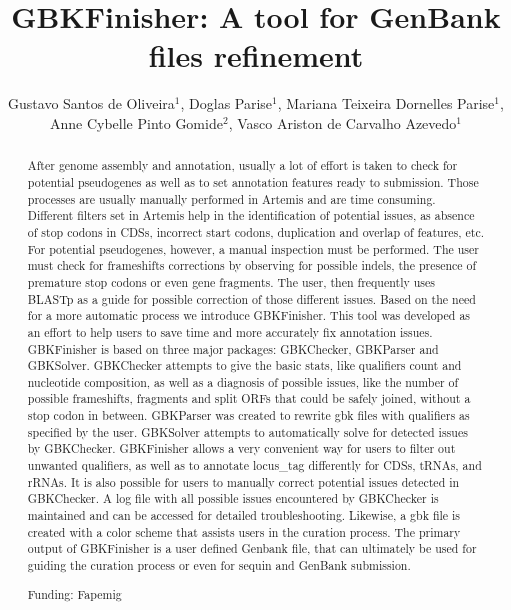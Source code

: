 \documentclass[twoside]{article}
\title{\vspace{-15mm}\fontsize{24pt}{10pt}\selectfont\textbf{GBKFinisher: A tool for GenBank files refinement}} %
\author{Gustavo Santos de Oliveira$^1$, Doglas Parise$^1$, Mariana Teixeira Dornelles Parise$^1$, Anne Cybelle Pinto Gomide$^2$, Vasco Ariston de Carvalho Azevedo$^1$}
\affil{1 UFMG\\ }
\date{}
\begin{document}
\maketitle %

\thispagestyle{fancy} %


\begin{abstract}
After genome assembly and annotation, usually a lot of effort is taken to check for potential pseudogenes as well as to set annotation features ready to submission. Those processes are usually manually performed in Artemis and are time consuming. Different filters set in Artemis help in the identification of potential issues, as absence of stop codons in CDSs, incorrect start codons, duplication and overlap of features, etc. For potential pseudogenes, however, a manual inspection must be performed. The user must check for frameshifts corrections by observing for possible indels, the presence of premature stop codons or even gene fragments. The user, then frequently uses BLASTp as a guide for possible correction of those different issues. Based on the need for a more automatic process we introduce GBKFinisher. This tool was developed as an effort to help users to save time and more accurately fix annotation issues. GBKFinisher is based on three major packages: GBKChecker, GBKParser and GBKSolver. GBKChecker attempts to give the basic stats, like qualifiers count and nucleotide composition, as well as a diagnosis of possible issues, like the number of possible frameshifts, fragments and split ORFs that could be safely joined, without a stop codon in between. GBKParser was created to rewrite gbk files with qualifiers as specified by the user. GBKSolver attempts to automatically solve for detected issues by GBKChecker.  GBKFinisher allows a very convenient way for users to filter out unwanted qualifiers, as well as to annotate locus\_tag differently for CDSs, tRNAs, and rRNAs. It is also possible for users to manually correct potential issues detected in GBKChecker. A log file with all possible issues encountered by GBKChecker is maintained and can be accessed for detailed troubleshooting. Likewise, a gbk file is created with a color scheme that assists users in the curation process. The primary output of GBKFinisher is a user defined Genbank file, that can ultimately be used for guiding the curation process or even for sequin and GenBank submission.

Funding: Fapemig
\end{abstract}
\end{document}
